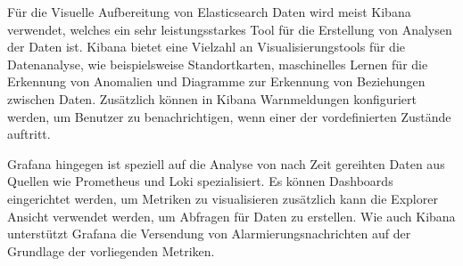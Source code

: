 Für die Visuelle Aufbereitung von Elasticsearch Daten wird meist Kibana verwendet, welches ein sehr leistungsstarkes Tool für die Erstellung von Analysen der Daten ist. 
Kibana bietet eine Vielzahl an Visualisierungstools für die Datenanalyse, wie beispielsweise Standortkarten, maschinelles Lernen für die Erkennung von Anomalien und Diagramme zur Erkennung von Beziehungen zwischen Daten. Zusätzlich können in Kibana Warnmeldungen konfiguriert werden, um Benutzer zu benachrichtigen, wenn einer der vordefinierten Zustände auftritt.

Grafana hingegen ist speziell auf die Analyse von nach Zeit gereihten Daten aus Quellen wie Prometheus und Loki spezialisiert.
Es können Dashboards eingerichtet werden, um Metriken zu visualisieren zusätzlich kann die Explorer Ansicht verwendet werden, um Abfragen für Daten zu erstellen. 
Wie auch Kibana unterstützt Grafana die Versendung von Alarmierungsnachrichten auf der Grundlage der vorliegenden Metriken.
\cite{Comparis37:online}